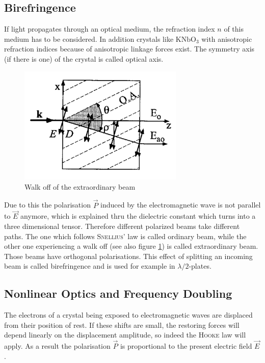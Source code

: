 \documentclass{protokoll_en}
\begin{document}
\subsection{Birefringence}
\label{cha:bi}
If light propagates through an optical medium, the refraction index $n$ of this medium has to be considered. In addition crystals like $\mathrm{KNbO}_3$ with anisotropic refraction indices because of anisotropic linkage forces exist. The symmetry axis (if there is one) of the crystal is called optical axis. 
\begin{figure}[H]
	\centering
		\includegraphics[width=0.7\textwidth]{graphics/brech}
	\caption{Walk off of the extraordinary beam~\cite{meschi}}
	\label{fig:brech}
\end{figure}
Due to this the polarisation $\vec{P}$ induced by the electromagnetic wave is not parallel to $\vec{E}$ anymore, which is explained thru the dielectric constant which turns into a three dimensional tensor. Therefore different polarized beams take different paths. The one which follows \textsc{Snellius'} law is called ordinary beam, while the other one experiencing a walk off (see also figure \ref{fig:brech}) is called extraordinary beam. Those beams have orthogonal polarisations. This effect of splitting an incoming beam is called birefringence and is used for example in $\lambda/2$-plates.


\subsection{Nonlinear Optics and Frequency Doubling}
The electrons of a crystal being exposed to electromagnetic waves are displaced from their position of rest. If these shifts are small, the restoring forces will depend linearly on the displacement amplitude, so indeed the \textsc{Hooke} law will apply. As a result the polarisation $\vec{P}$ is proportional to the present electric field $\vec{E}$. 
\end{document}
